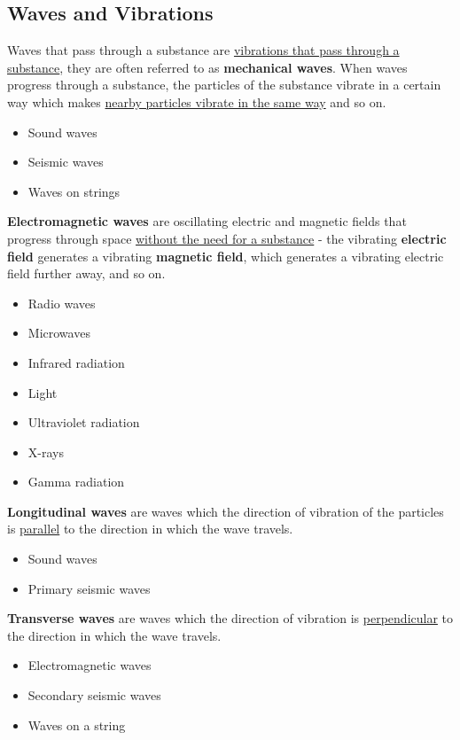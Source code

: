 \subsection{Waves and Vibrations}

Waves that pass through a substance are \underline{vibrations that pass through a substance}, they are often referred to as \textbf{mechanical waves}. When waves progress through a substance, the particles of the substance vibrate in a certain way which makes \underline{nearby particles vibrate in the same way} and so on.
\begin{itemize}
    \item Sound waves
    \item Seismic waves
    \item Waves on strings
\end{itemize}

\textbf{Electromagnetic waves} are oscillating electric and magnetic fields that progress through space \underline{without the need for a substance} - the vibrating \textbf{electric field} generates a vibrating \textbf{magnetic field}, which generates a vibrating electric field further away, and so on.
\begin{itemize}
    \item Radio waves
    \item Microwaves
    \item Infrared radiation
    \item Light
    \item Ultraviolet radiation
    \item X-rays
    \item Gamma radiation
\end{itemize}

\textbf{Longitudinal waves} are waves which the direction of vibration of the particles is \underline{parallel} to the direction in which the wave travels.
\begin{itemize}
    \item Sound waves
    \item Primary seismic waves
\end{itemize}

\textbf{Transverse waves} are waves which the direction of vibration is \underline{perpendicular} to the direction in which the wave travels.
\begin{itemize}
    \item Electromagnetic waves
    \item Secondary seismic waves
    \item Waves on a string
\end{itemize}

